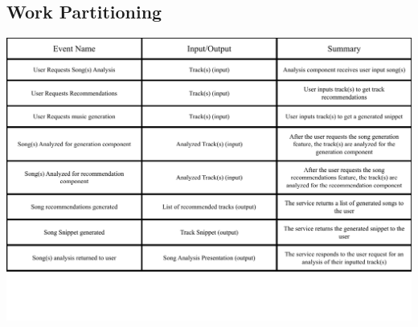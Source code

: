 \documentclass[12pt]{article}
\begin{document}
\subsection{Work Partitioning}
\includegraphics[width=\textwidth]{6_3_work_partitioning_table.pdf}
\end{document}
